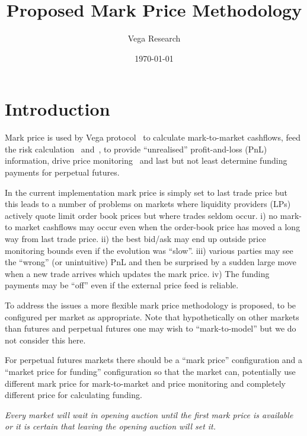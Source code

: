 \documentclass[10pt]{article}
\author{Vega Research}
\title{Proposed Mark Price Methodology}
\date{
    \vspace{2em}
    \today\\
    \vspace{0.5em}
    {\footnotesize }
    \vspace{2em}
}
\begin{document}
\thispagestyle{empty} %
\pagestyle{plain}
\lhead[{}{}]       {{}{}}
\rhead[{}{}]       {{}{}}

\maketitle


\pagestyle{fancyplain}
\rhead{\rightmark}
\cfoot{\thepage}


\section{Introduction}

Mark price is used by Vega protocol~\cite{vega whitepaper} to calculate mark-to-market cashflows, feed the risk calculation~\cite{margins paper} and~\cite{margins spec}, to provide ``unrealised'' profit-and-loss (PnL) information, drive price monitoring~\cite{price monitoring spec} and last but not least determine funding payments for perpetual futures. 

In the current implementation mark price is simply set to last trade price but this leads to a number of problems on markets where liquidity providers (LPs) actively quote limit order book prices but where trades seldom occur. i) no mark-to market cashflows may occur even when the order-book price has moved a long way from last trade price. ii) the best bid/ask may end up outside price monitoring bounds even if the evolution was ``slow''. iii) various parties may see the ``wrong'' (or unintuitive) PnL and then be surprised by a sudden large move when a new trade arrives which updates the mark price. iv) The funding payments may be ``off'' even if the external price feed is reliable. 

To address the issues a more flexible mark price methodology is proposed, to be configured per market as appropriate. 
Note that hypothetically on other markets than futures and perpetual futures one may wish to ``mark-to-model'' but we do not consider this here. 

For perpetual futures markets there should be a ``mark price'' configuration and a ``market price for funding'' configuration so that the market can, potentially use different mark price for mark-to-market and price monitoring and completely different price for calculating funding. 

{\em Every market will wait in opening auction until the first mark price is available or it is certain that leaving the opening auction will set it.}
\end{document}
